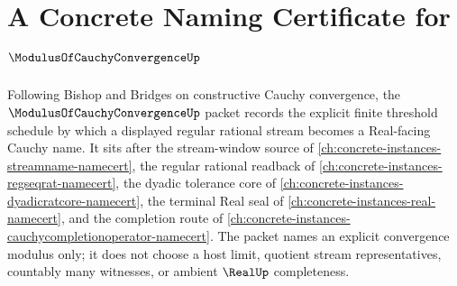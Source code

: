 \chapter{A Concrete Naming Certificate for $\ModulusOfCauchyConvergenceUp$}
\label{ch:concrete-instances-modulus-of-cauchy-convergence-namecert}

Following Bishop and Bridges on constructive Cauchy convergence, the $\ModulusOfCauchyConvergenceUp$ packet records the explicit finite threshold schedule by which a displayed regular rational stream becomes a Real-facing Cauchy name. It sits after the stream-window source of \autoref{ch:concrete-instances-streamname-namecert}, the regular rational readback of \autoref{ch:concrete-instances-regseqrat-namecert}, the dyadic tolerance core of \autoref{ch:concrete-instances-dyadicratcore-namecert}, the terminal Real seal of \autoref{ch:concrete-instances-real-namecert}, and the completion route of \autoref{ch:concrete-instances-cauchycompletionoperator-namecert}. The packet names an explicit convergence modulus only; it does not choose a host limit, quotient stream representatives, countably many witnesses, or ambient $\RealUp$ completeness.

